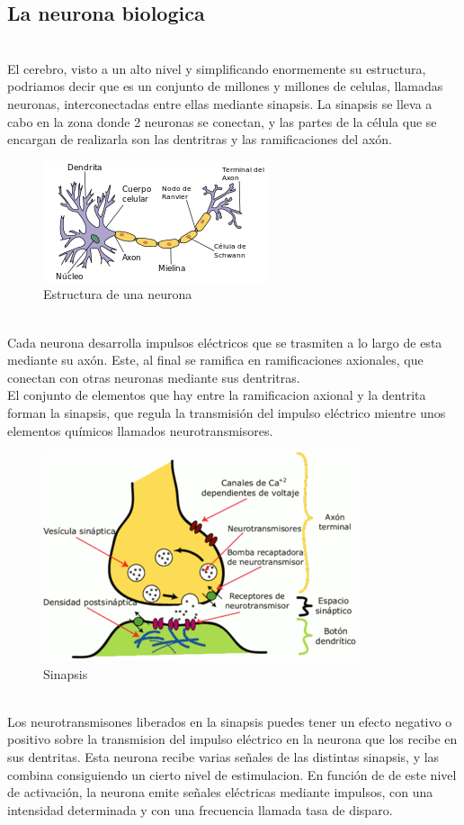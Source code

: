 \subsection {La neurona biologica} \mbox{}\\
El cerebro, visto a un alto nivel y simplificando enormemente su estructura, podriamos decir que es un conjunto de millones y millones de celulas, llamadas neuronas, interconectadas entre ellas mediante sinapsis. La sinapsis se lleva a cabo en la zona donde 2 neuronas se conectan, y las partes de la célula que se encargan de realizarla son las dentritras y las ramificaciones del axón.
\begin{figure}[htp]
\centering
\includegraphics[scale=1]{images/neurona.png}
\caption{Estructura de una neurona}
\end{figure}\\
Cada neurona desarrolla impulsos eléctricos que se trasmiten a lo largo de esta mediante su axón. Este, al final se ramifica en ramificaciones axionales, que conectan con otras neuronas mediante sus dentritras.\\
El conjunto de elementos que hay entre la ramificacion axional y la dentrita forman la sinapsis, que regula la transmisión del impulso eléctrico mientre unos elementos químicos llamados neurotransmisores.
\begin{figure}[htp]
\centering
\includegraphics[scale=0.70]{images/sinapsis.png}
\caption{Sinapsis}
\end{figure}\\
Los neurotransmisones liberados en la sinapsis puedes tener un efecto negativo o positivo sobre la transmision del impulso eléctrico en la neurona que los recibe en sus dentritas. Esta neurona recibe varias señales de las distintas sinapsis, y las combina consiguiendo un cierto nivel de estimulacion. En función de de este nivel de activación, la neurona emite señales eléctricas mediante impulsos, con una intensidad determinada y con una frecuencia llamada tasa de disparo.\\
